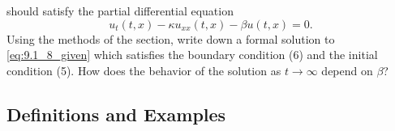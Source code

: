 \documentclass{article}
\begin{document}
\begin{enumerate}
            should satisfy the partial differential equation
            \begin{equation}
                  u_t(t,x)-\kappa u_{xx}(t,x)-\beta u(t,x) = 0.
                  \label{eq:9.1_8_given}
            \end{equation}
            Using the methods of the section, write down a formal solution to
            \eqref{eq:9.1_8_given} which satisfies the boundary condition (6) and the
            initial condition (5). How does the behavior of the solution as $t\to\infty$
            depend on $\beta$?
\end{enumerate}

\subsection{Definitions and Examples}
\end{document}

